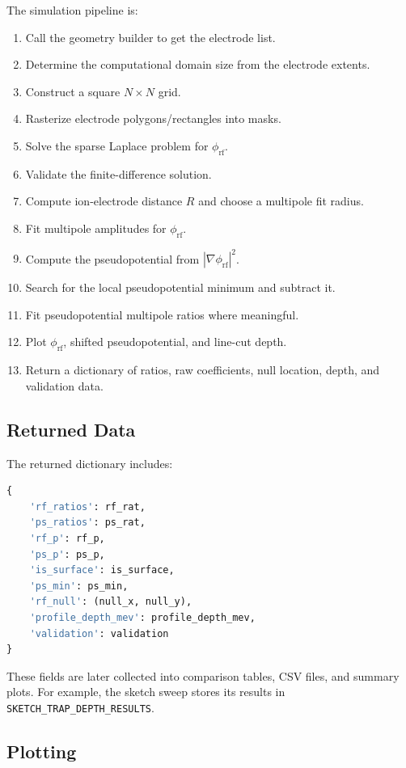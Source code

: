 \documentclass[11pt]{article}
\begin{document}
The simulation pipeline is:
\begin{enumerate}[label=\arabic*.]
  \item Call the geometry builder to get the electrode list.
  \item Determine the computational domain size from the electrode extents.
  \item Construct a square \(N\times N\) grid.
  \item Rasterize electrode polygons/rectangles into masks.
  \item Solve the sparse Laplace problem for \(\phi_{\mathrm{rf}}\).
  \item Validate the finite-difference solution.
  \item Compute ion-electrode distance \(R\) and choose a multipole fit radius.
  \item Fit multipole amplitudes for \(\phi_{\mathrm{rf}}\).
  \item Compute the pseudopotential from \(|\nabla\phi_{\mathrm{rf}}|^2\).
  \item Search for the local pseudopotential minimum and subtract it.
  \item Fit pseudopotential multipole ratios where meaningful.
  \item Plot \(\phi_{\mathrm{rf}}\), shifted pseudopotential, and line-cut
        depth.
  \item Return a dictionary of ratios, raw coefficients, null location, depth,
        and validation data.
\end{enumerate}

\subsection{Returned Data}

The returned dictionary includes:
\begin{lstlisting}[language=Python]
{
    'rf_ratios': rf_rat,
    'ps_ratios': ps_rat,
    'rf_p': rf_p,
    'ps_p': ps_p,
    'is_surface': is_surface,
    'ps_min': ps_min,
    'rf_null': (null_x, null_y),
    'profile_depth_mev': profile_depth_mev,
    'validation': validation
}
\end{lstlisting}
These fields are later collected into comparison tables, CSV files, and summary
plots. For example, the sketch sweep stores its results in
\texttt{SKETCH\_TRAP\_DEPTH\_RESULTS}.

\subsection{Plotting}
\end{document}
